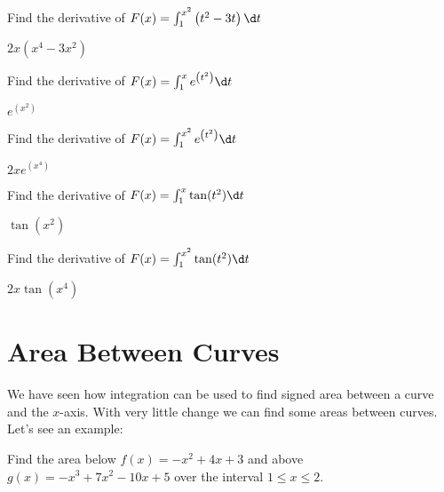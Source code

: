 \begin{exercises}
\begin{exercise} Find the derivative of $F(x)=\int_1^{x^2} \left(t^2-3t\right)\d t$
\begin{answer} $2x(x^4-3x^2)$
\end{answer}\end{exercise}

\begin{exercise} Find the derivative of $F(x)=\int_1^x e^{\left(t^2\right)}\d t$
\begin{answer} $e^{\left(x^2\right)}$
\end{answer}\end{exercise}

\begin{exercise} Find the derivative of $F(x)=\int_1^{x^2} e^{\left(t^2\right)}\d t$
\begin{answer} $2xe^{\left(x^4\right)}$
\end{answer}\end{exercise}


\begin{exercise} Find the derivative of $F(x)=\int_1^x \tan(t^2)\d t$
\begin{answer} $\tan(x^2)$
\end{answer}\end{exercise}

\begin{exercise} Find the derivative of $F(x)=\int_1^{x^2} \tan(t^2)\d t$
\begin{answer} $2x\tan(x^4)$
\end{answer}\end{exercise}

\end{exercises}













\section{Area Between Curves}

We have seen how integration can be used to find signed area between a
curve and the $x$-axis. With very little change we can find some areas
between curves. Let's see an example:

\begin{example} Find the area below $f(x)= -x^2+4x+3$ and above
$g(x)=-x^3+7x^2-10x+5$ over the interval $1\le x\le2$. 
\end{example}

